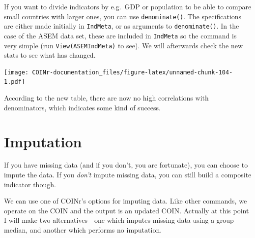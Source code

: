 \documentclass[
]{book}
\newenvironment{Shaded}{\begin{snugshade}}{\end{snugshade}}
\newcommand{\AttributeTok}[1]{\textcolor[rgb]{0.77,0.63,0.00}{#1}}
\newcommand{\CommentTok}[1]{\textcolor[rgb]{0.56,0.35,0.01}{\textit{#1}}}
\newcommand{\DocumentationTok}[1]{\textcolor[rgb]{0.56,0.35,0.01}{\textbf{\textit{#1}}}}
\newcommand{\FunctionTok}[1]{\textcolor[rgb]{0.00,0.00,0.00}{#1}}
\newcommand{\NormalTok}[1]{#1}
\newcommand{\OtherTok}[1]{\textcolor[rgb]{0.56,0.35,0.01}{#1}}
\newcommand{\SpecialCharTok}[1]{\textcolor[rgb]{0.00,0.00,0.00}{#1}}
\newcommand{\StringTok}[1]{\textcolor[rgb]{0.31,0.60,0.02}{#1}}
\begin{document}
If you want to divide indicators by e.g.~GDP or population to be able to compare small countries with larger ones, you can use \texttt{denominate()}. The specifications are either made initially in \texttt{IndMeta}, or as arguments to \texttt{denominate()}. In the case of the ASEM data set, these are included in \texttt{IndMeta} so the command is very simple (run \texttt{View(ASEMIndMeta)} to see). We will afterwards check the new stats to see what has changed.

\begin{Shaded}
\end{Shaded}

\texttt{[image: COINr-documentation\_files/figure-latex/unnamed-chunk-104-1.pdf]}

According to the new table, there are now no high correlations with denominators, which indicates some kind of success.

\hypertarget{imputation}{%
\section{Imputation}\label{imputation}}

If you have missing data (and if you don't, you are fortunate), you can choose to impute the data. If you \emph{don't} impute missing data, you can still build a composite indicator though.

We can use one of COINr's options for imputing data. Like other commands, we operate on the COIN and the output is an updated COIN. Actually at this point I will make two alternatives - one which imputes missing data using a group median, and another which performs no imputation.
\end{document}
